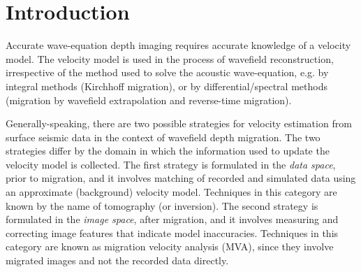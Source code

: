 \section{Introduction}


Accurate wave-equation depth imaging requires accurate knowledge of a
velocity model. The velocity model is used in the process of wavefield
reconstruction, irrespective of the method used to solve the acoustic
wave-equation, e.g. by integral methods (Kirchhoff migration), or by
differential/spectral methods (migration by wavefield extrapolation
and reverse-time migration).


Generally-speaking, there are two possible strategies for velocity
estimation from surface seismic data in the context of wavefield depth
migration. The two strategies differ by the domain in which the
information used to update the velocity model is collected. The first
strategy is formulated in the \textit{data space}, prior to migration,
and it involves matching of recorded and simulated data using an
approximate (background) velocity model. Techniques in this category
are known by the name of tomography (or inversion).  
The
second strategy is formulated in the \textit{image space}, after
migration, and it involves measuring and correcting image features
that indicate model inaccuracies. Techniques in this category are
known as migration velocity analysis (MVA), since they involve
migrated images and not the recorded data directly.


